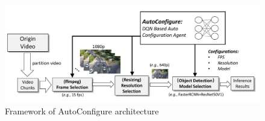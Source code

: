 

\begin{figure}[!t]
	\centerline{\includegraphics[width=0.9\linewidth]{figures/framework.pdf}}
	\caption{Framework of AutoConfigure architecture}
	\label{fig: framework}
\end{figure}



